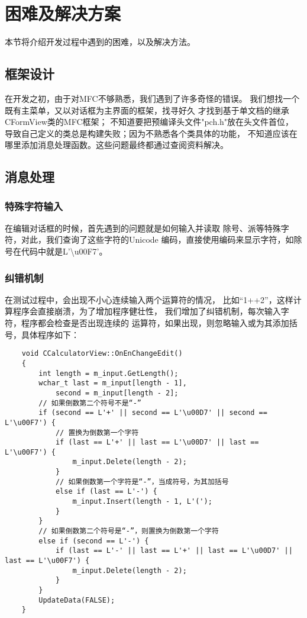 \section{困难及解决方案}
本节将介绍开发过程中遇到的困难，以及解决方法。

\subsection{框架设计}
在开发之初，由于对MFC不够熟悉，我们遇到了许多奇怪的错误。
我们想找一个既有主菜单，又以对话框为主界面的框架，找寻好久
才找到基于单文档的继承CFormView类的MFC框架；
不知道要把预编译头文件"pch.h"放在头文件首位，
导致自己定义的类总是构建失败；因为不熟悉各个类具体的功能，
不知道应该在哪里添加消息处理函数。这些问题最终都通过查阅资料解决。

\subsection{消息处理}

\subsubsection*{特殊字符输入}

在编辑对话框的时候，首先遇到的问题就是如何输入并读取
除号、派等特殊字符，对此，我们查询了这些字符的Unicode
编码，直接使用编码来显示字符，如除号在代码中就是L'\textbackslash u00F7'。

\subsubsection*{纠错机制}

在测试过程中，会出现不小心连续输入两个运算符的情况，
比如“1++2”，这样计算程序会直接崩溃，为了增加程序健壮性，
我们增加了纠错机制，每次输入字符，程序都会检查是否出现连续的
运算符，如果出现，则忽略输入或为其添加括号，具体程序如下：
\begin{lstlisting}
    void CCalculatorView::OnEnChangeEdit()
    {
        int length = m_input.GetLength();
        wchar_t last = m_input[length - 1], 
            second = m_input[length - 2];
        // 如果倒数第二个符号不是“-”
        if (second == L'+' || second == L'\u00D7' || second == L'\u00F7') {
            // 置换为倒数第一个字符
            if (last == L'+' || last == L'\u00D7' || last == L'\u00F7') {
                m_input.Delete(length - 2);
            } 
            // 如果倒数第一个字符是“-”，当成符号，为其加括号
            else if (last == L'-') {
                m_input.Insert(length - 1, L'(');
            }	
        }
        // 如果倒数第二个符号是“-”，则置换为倒数第一个字符
        else if (second == L'-') {
            if (last == L'-' || last == L'+' || last == L'\u00D7' || last == L'\u00F7') {
                m_input.Delete(length - 2);
            }
        }
        UpdateData(FALSE);
    }
\end{lstlisting}

